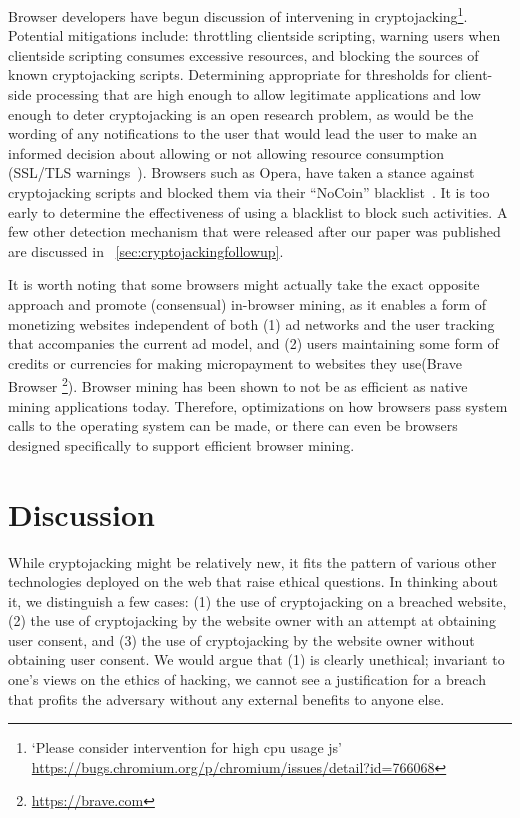 Browser developers have begun discussion of intervening in cryptojacking\footnote{`Please consider intervention for high cpu usage js' \url{https://bugs.chromium.org/p/chromium/issues/detail?id=766068}}. Potential mitigations include: throttling clientside scripting, warning users when clientside scripting consumes excessive resources, and blocking the sources of known cryptojacking scripts. Determining appropriate for thresholds for client-side processing that are high enough to allow legitimate applications and low enough to deter cryptojacking is an open research problem, as would be the wording of any notifications to the user that would lead the user to make an informed decision about allowing or not allowing resource consumption (\cf SSL/TLS warnings~\cite{SEAAC09,SHB11,Acer:2017:WWR:3133956.3134007}).
Browsers such as Opera, have taken a stance against cryptojacking scripts and blocked them via their ``NoCoin'' blacklist~\cite{operanocoin}. It is too early to determine the effectiveness of using a blacklist to block such activities.  A few other detection mechanism that were released after our paper was published are discussed in ~\ref{sec:cryptojackingfollowup}.

It is worth noting that some browsers might actually take the exact opposite approach and promote (consensual) in-browser mining, as it enables a form of monetizing websites independent of both (1) ad networks and the user tracking that accompanies the current ad model, and (2) users maintaining some form of credits or currencies for making micropayment to websites they use(\eg Brave Browser \footnote{\url{https://brave.com}}). Browser mining has been shown to not be as efficient as native mining applications today. Therefore, optimizations on how browsers pass system calls to the operating system can be made, or there can even be browsers designed specifically to support efficient browser mining. 



\section{Discussion}
\label{sec:ethics}

While cryptojacking might be relatively new, it fits the pattern of various other technologies deployed on the web that raise ethical questions. In thinking about it, we distinguish a few cases: (1) the use of cryptojacking on a breached website, (2) the use of cryptojacking by the website owner with an attempt at obtaining user consent, and (3) the use of cryptojacking by the website owner without obtaining user consent. We would argue that (1) is clearly unethical; invariant to one's views on the ethics of hacking, we cannot see a justification for a breach that profits the adversary without any external benefits to anyone else.


